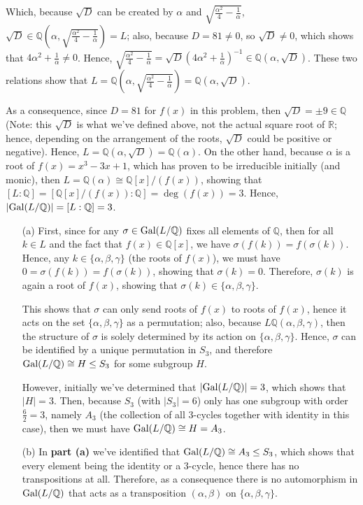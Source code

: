 \documentclass{article}
\newcommand{\QQ}{\mathbb{Q}}
\newcommand{\RR}{\mathbb{R}}
\newcommand{\Gal}{\textmd{Gal}}
\begin{document}
Which, because $\sqrt{D}$ can be created by $\alpha$ and $\sqrt{\frac{\alpha^2}{4}-\frac{1}{\alpha}}$, $\sqrt{D}\in \QQ\left(\alpha,\sqrt{\frac{\alpha^2}{4}-\frac{1}{\alpha}}\right)=L$; also, because $D=81\neq 0$, so $\sqrt{D}\neq 0$, which shows that $4\alpha^2+\frac{1}{\alpha}\neq 0$. Hence, $\sqrt{\frac{\alpha^2}{4}-\frac{1}{\alpha}}=\sqrt{D}\left(4\alpha^2+\frac{1}{\alpha}\right)^{-1}\in\QQ(\alpha,\sqrt{D})$. These two relations show that $L=\QQ\left(\alpha,\sqrt{\frac{\alpha^2}{4}-\frac{1}{\alpha}}\right)=\QQ(\alpha,\sqrt{D})$.

As a consequence, since $D=81$ for $f(x)$ in this problem, then $\sqrt{D}=\pm 9\in \QQ$ (Note: this $\sqrt{D}$ is what we've defined above, not the actual square root of $\RR$; hence, depending on the arrangement of the roots, $\sqrt{D}$ could be positive or negative). Hence, $L=\QQ(\alpha,\sqrt{D})=\QQ(\alpha)$. On the other hand, because $\alpha$ is a root of $f(x)=x^3-3x+1$, which has proven to be irreducible initially (and monic), then $L=\QQ(\alpha)\cong \QQ[x]/(f(x))$, showing that $[L:\QQ]=[\QQ[x]/(f(x)):\QQ] = \deg(f(x)) = 3$. Hence, $|\Gal(L/\QQ)| = [L:\QQ]=3$.
\begin{itemize}
    \item[(a)] First, since for any $\sigma\in \Gal(L/\QQ)$ fixes all elements of $\QQ$, then for all $k\in L$ and the fact that $f(x)\in \QQ[x]$, we have $\sigma(f(k))=f(\sigma(k))$. Hence, any $k\in\{\alpha,\beta,\gamma\}$ (the roots of $f(x)$), we must have $0=\sigma(f(k))= f(\sigma(k))$, showing that $\sigma(k)=0$. Therefore, $\sigma(k)$ is again a root of $f(x)$, showing that $\sigma(k)\in\{\alpha,\beta,\gamma\}$.
    
    This shows that $\sigma$ can only send roots of $f(x)$ to roots of $f(x)$, hence it acts on the set $\{\alpha,\beta,\gamma\}$ as a permutation; also, because $L\QQ(\alpha,\beta,\gamma)$, then the structure of $\sigma$ is solely determined by its action on $\{\alpha,\beta,\gamma\}$. Hence, $\sigma$ can be identified by a unique permutation in $S_3$, and therefore $\Gal(L/\QQ)\cong H\leq S_3$ for some subgroup $H$.
    
    However, initially we've determined that $|\Gal(L/\QQ)| = 3$, which shows that $|H|=3$. Then, because $S_3$ (with $|S_3|=6$) only has one subgroup with order $\frac{6}{2}=3$, namely $A_3$ (the collection of all $3$-cycles together with identity in this case), then we must have $\Gal(L/\QQ)\cong H=A_3$.
    \item[(b)] In \textbf{part (a)} we've identified that $\Gal(L/\QQ)\cong A_3\leq S_3$, which shows that every element being the identity or a $3$-cycle, hence there has no transpositions at all. Therefore, as a consequence there is no automorphism in $\Gal(L/\QQ)$ that acts as a transposition $(\alpha,\beta)$ on $\{\alpha,\beta,\gamma\}$.
\end{itemize}
\end{document}
